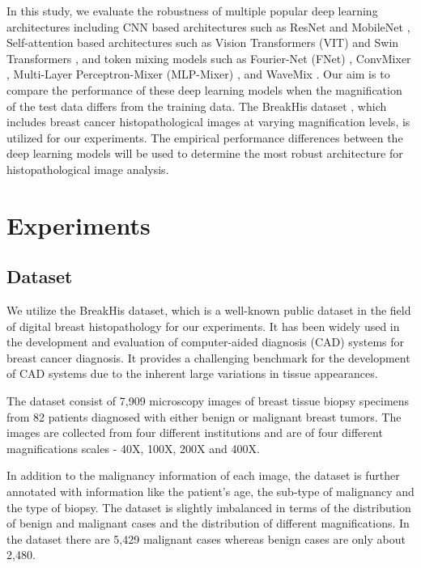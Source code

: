\documentclass[nohyperref]{article}
\theoremstyle{plain}
\theoremstyle{definition}
\theoremstyle{remark}
\begin{document}
In this study, we evaluate the robustness of multiple popular deep learning architectures including CNN based architectures such as ResNet \cite{he2016deep} and MobileNet \cite{Howard2017-rm}, Self-attention based architectures such as Vision Transformers (VIT) \cite{dosovitskiy2021an} and Swin Transformers \cite{liu2021swin}, and token mixing models such as Fourier-Net (FNet) \cite{lee2021fnet}, ConvMixer \cite{trockman2022patches}, Multi-Layer Perceptron-Mixer (MLP-Mixer) \cite{tolstikhin2021mlp}, and WaveMix \cite{https://doi.org/10.48550/arxiv.2205.14375}. Our aim is to compare the performance of these deep learning models when the magnification of the test data differs from the training data. The BreakHis \cite{spanhol2015dataset} dataset , which includes breast cancer histopathological images at varying magnification levels, is utilized for our experiments. The empirical performance differences between the deep learning models will be used to determine the most robust architecture for histopathological image analysis.












\section{Experiments}
\subsection{Dataset}
We utilize the BreakHis \cite{spanhol2015dataset} dataset, which is a well-known public dataset in the field of digital breast histopathology for our experiments. It has been widely used in the development and evaluation of computer-aided diagnosis (CAD) systems for breast cancer diagnosis. It provides a challenging benchmark for the development of CAD systems due to the inherent large variations in tissue appearances.


The dataset consist of  7,909 microscopy images of breast tissue biopsy specimens from 82 patients diagnosed with either benign or malignant breast tumors. The images are collected from four different institutions and are of four different magnifications scales - 40X, 100X, 200X and 400X.

In addition to the malignancy information of each image, the dataset is further annotated with information like the patient's age, the sub-type of malignancy and the type of biopsy. The dataset is slightly imbalanced in terms of the distribution of benign and malignant cases and the distribution of different magnifications. In the dataset there are 5,429 malignant cases whereas benign cases are only about 2,480. 
\end{document}
